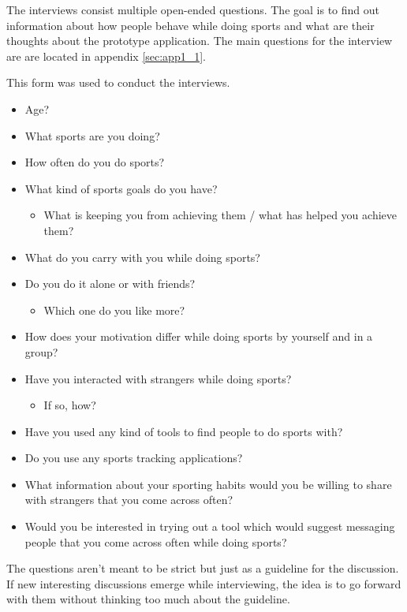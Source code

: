The interviews consist multiple open-ended questions. The goal is to find out information about how people behave while doing sports and what are their thoughts about the prototype application. The main questions for the interview are are located in appendix \ref{sec:app1_1}.

This form was used to conduct the interviews.

\begin{itemize}
	\item Age?
	\item What sports are you doing?
	\item How often do you do sports?
	\item What kind of sports goals do you have?
		\begin{itemize}
			\item What is keeping you from achieving them / what has helped you achieve them?
		\end{itemize}
	\item What do you carry with you while doing sports?
	\item Do you do it alone or with friends?
		\begin{itemize}
			\item Which one do you like more?
		\end{itemize}
	\item How does your motivation differ while doing sports by yourself and in a group?
	\item Have you interacted with strangers while doing sports?
		\begin{itemize}
			\item If so, how?
		\end{itemize}
	\item Have you used any kind of tools to find people to do sports with?
	\item Do you use any sports tracking applications?
	\item What information about your sporting habits would you be willing to share with strangers that you come across often?
	\item Would you be interested in trying out a tool which would suggest messaging people that you come across often while doing sports?
\end{itemize}

The questions aren't meant to be strict but just as a guideline for the discussion. If new interesting discussions emerge while interviewing, the idea is to go forward with them without thinking too much about the guideline.


